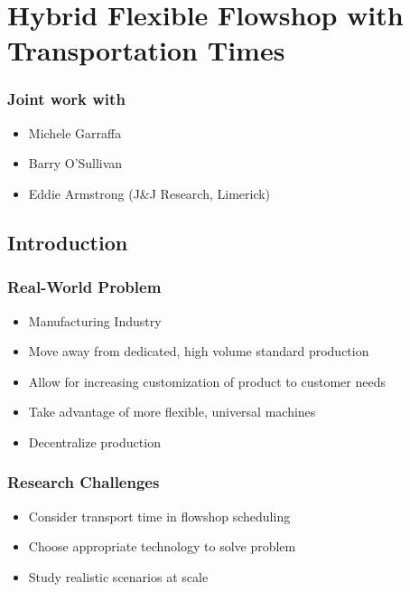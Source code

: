 \section{Hybrid Flexible Flowshop with Transportation Times}


\begin{frame}
\frametitle{Joint work with}
\begin{itemize}
\item Michele Garraffa
\item Barry O'Sullivan
\item Eddie Armstrong (J\&J Research, Limerick)
\end{itemize}
\end{frame}

\subsection{Introduction}

\begin{frame}
\frametitle{Real-World Problem}
\begin{itemize}
\item Manufacturing Industry
\item Move away from dedicated, high volume standard production
\item Allow for increasing customization of product to customer needs
\item Take advantage of more flexible, universal machines
\item Decentralize production
\end{itemize}
\end{frame}

\begin{frame}
\frametitle{Research Challenges}
\begin{itemize}
\item Consider transport time in flowshop scheduling
\item Choose appropriate technology to solve problem
\item Study realistic scenarios at scale
\end{itemize}
\end{frame}


